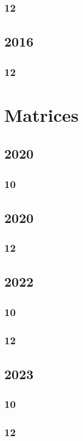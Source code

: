 \documentclass[11pt]{book}
\begin{document}
\subsection{12}


\section{2016}
\subsection{12}




\chapter{Matrices}
\section{2020}
\subsection{10}

\section{2020}
\subsection{12}

\section{2022}
\subsection{10}

\subsection{12}

\section{2023}
\subsection{10}

\subsection{12}

\end{document}
